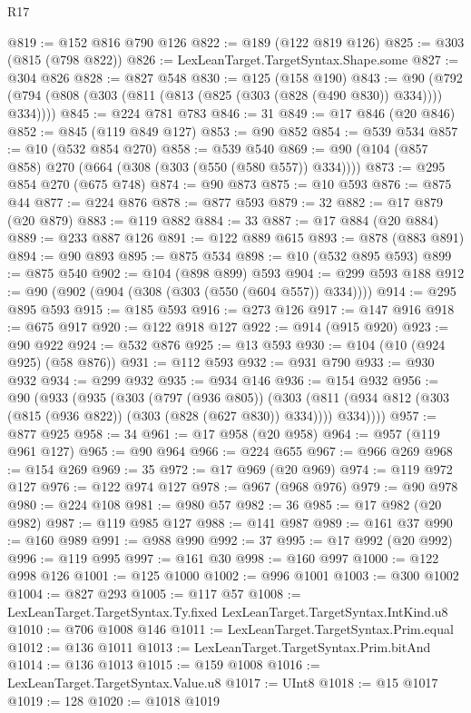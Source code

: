 \begin{lexlean}{R17}
\begin{coremodule}
{{{{{{{{{{{{{{{{{{{{{{{{{{{{{{{{{{{{{{{{{{{{{{{{{{{{{{{{{{{{{{{{{{{{{{{{{{{{{{{{{{{{{{{{{{{{{{{{{{{{{{{{{{{@819 := @152 @816 @790 @126
@822 := @189 (@122 @819 @126)
@825 := @303 (@815 (@798 @822))
@826 := LexLeanTarget.TargetSyntax.Shape.some
@827 := @304 @826
@828 := @827 @548
@830 := @125 (@158 @190)
@843 := @90 (@792 (@794 (@808 (@303 (@811 (@813 (@825 (@303 (@828 (@490 @830)) @334)))) @334))))
@845 := @224 @781 @783
@846 := 31
@849 := @17 @846 (@20 @846)
@852 := @845 (@119 @849 @127)
@853 := @90 @852
@854 := @539 @534
@857 := @10 (@532 @854 @270)
@858 := @539 @540
@869 := @90 (@104 (@857 @858) @270 (@664 (@308 (@303 (@550 (@580 @557)) @334))))
@873 := @295 @854 @270 (@675 @748)
@874 := @90 @873
@875 := @10 @593
@876 := @875 @44
@877 := @224 @876
@878 := @877 @593
@879 := 32
@882 := @17 @879 (@20 @879)
@883 := @119 @882
@884 := 33
@887 := @17 @884 (@20 @884)
@889 := @233 @887 @126
@891 := @122 @889 @615
@893 := @878 (@883 @891)
@894 := @90 @893
@895 := @875 @534
@898 := @10 (@532 @895 @593)
@899 := @875 @540
@902 := @104 (@898 @899) @593
@904 := @299 @593 @188
@912 := @90 (@902 (@904 (@308 (@303 (@550 (@604 @557)) @334))))
@914 := @295 @895 @593
@915 := @185 @593
@916 := @273 @126
@917 := @147 @916
@918 := @675 @917
@920 := @122 @918 @127
@922 := @914 (@915 @920)
@923 := @90 @922
@924 := @532 @876
@925 := @13 @593
@930 := @104 (@10 (@924 @925) (@58 @876))
@931 := @112 @593
@932 := @931 @790
@933 := @930 @932
@934 := @299 @932
@935 := @934 @146
@936 := @154 @932
@956 := @90
    (@933
      (@935
        (@303
          (@797 (@936 @805))
          (@303 (@811 (@934 @812 (@303 (@815 (@936 @822)) (@303 (@828 (@627 @830)) @334)))) @334))))
@957 := @877 @925
@958 := 34
@961 := @17 @958 (@20 @958)
@964 := @957 (@119 @961 @127)
@965 := @90 @964
@966 := @224 @655
@967 := @966 @269
@968 := @154 @269
@969 := 35
@972 := @17 @969 (@20 @969)
@974 := @119 @972 @127
@976 := @122 @974 @127
@978 := @967 (@968 @976)
@979 := @90 @978
@980 := @224 @108
@981 := @980 @57
@982 := 36
@985 := @17 @982 (@20 @982)
@987 := @119 @985 @127
@988 := @141 @987
@989 := @161 @37
@990 := @160 @989
@991 := @988 @990
@992 := 37
@995 := @17 @992 (@20 @992)
@996 := @119 @995
@997 := @161 @30
@998 := @160 @997
@1000 := @122 @998 @126
@1001 := @125 @1000
@1002 := @996 @1001
@1003 := @300 @1002
@1004 := @827 @293
@1005 := @117 @57
@1008 := LexLeanTarget.TargetSyntax.Ty.fixed LexLeanTarget.TargetSyntax.IntKind.u8
@1010 := @706 @1008 @146
@1011 := LexLeanTarget.TargetSyntax.Prim.equal
@1012 := @136 @1011
@1013 := LexLeanTarget.TargetSyntax.Prim.bitAnd
@1014 := @136 @1013
@1015 := @159 @1008
@1016 := LexLeanTarget.TargetSyntax.Value.u8
@1017 := UInt8
@1018 := @15 @1017
@1019 := 128
@1020 := @1018 @1019
}}}}}}}}}}}}}}}}}}}}}}}}}}}}}}}}}}}}}}}}}}}}}}}}}}}}}}}}}}}}}}}}}}}}}}}}}}}}}}}}}}}}}}}}}}}}}}}}}}}}}}}}}}}
\end{coremodule}
\end{lexlean}
